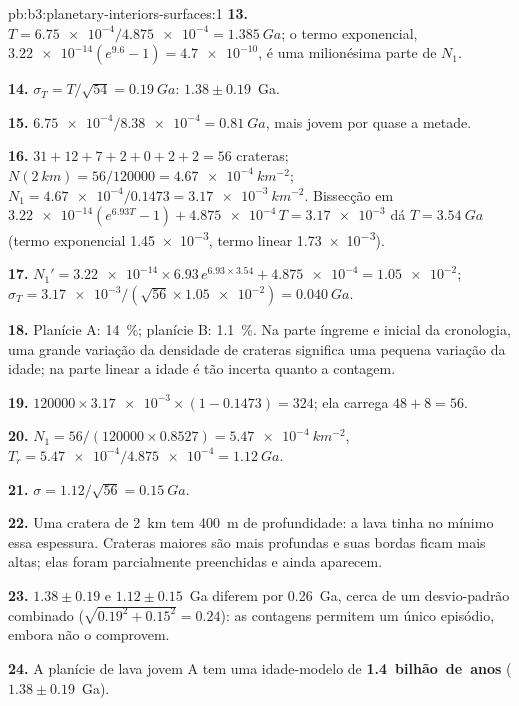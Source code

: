 \begin{solution}{pb:b3:planetary-interiors-surfaces:1}
\textbf{13.} $T = \num{6.75e-4}/\num{4.875e-4} = \qty{1.385}{Ga}$; o
termo exponencial, $\num{3.22e-14}(e^{9.6} - 1) = \num{4.7e-10}$, é uma
milionésima parte de $N_1$.

\textbf{14.} $\sigma_T = T/\sqrt{54} = \qty{0.19}{Ga}$: $1.38 \pm 0.19$~Ga.

\textbf{15.} $\num{6.75e-4}/\num{8.38e-4} = \qty{0.81}{Ga}$, mais jovem por
quase a metade.

\textbf{16.} $31 + 12 + 7 + 2 + 0 + 2 + 2 = 56$ crateras; $N(\qty{2}{km}) =
56/120000 = \qty{4.67e-4}{km^{-2}}$; $N_1 = \num{4.67e-4}/0.1473 =
\qty{3.17e-3}{km^{-2}}$. Bissecção em $\num{3.22e-14}(e^{6.93T} - 1) +
\num{4.875e-4}\,T = \num{3.17e-3}$ dá $T = \qty{3.54}{Ga}$ (termo exponencial
\num{1.45e-3}, termo linear \num{1.73e-3}).

\textbf{17.} $N_1' = \num{3.22e-14}\times6.93\,e^{6.93\times3.54} +
\num{4.875e-4} = \num{1.05e-2}$; $\sigma_T = \num{3.17e-3}/(\sqrt{56}\times
\num{1.05e-2}) = \qty{0.040}{Ga}$.

\textbf{18.} Planície A: \qty{14}{\percent}; planície B: \qty{1.1}{\percent}. Na
parte íngreme e inicial da cronologia, uma grande variação da densidade de
crateras significa uma pequena variação da idade; na parte linear a idade é tão
incerta quanto a contagem.

\textbf{19.} $120000\times\num{3.17e-3}\times(1 - 0.1473) = 324$; ela
carrega $48 + 8 = 56$.

\textbf{20.} $N_1 = 56/(120000\times0.8527) = \qty{5.47e-4}{km^{-2}}$,
$T_r = \num{5.47e-4}/\num{4.875e-4} = \qty{1.12}{Ga}$.

\textbf{21.} $\sigma = 1.12/\sqrt{56} = \qty{0.15}{Ga}$.

\textbf{22.} Uma cratera de \qty{2}{km} tem \qty{400}{m} de profundidade: a lava tinha
no mínimo essa espessura. Crateras maiores são mais profundas e suas bordas
ficam mais altas; elas foram parcialmente preenchidas e ainda aparecem.

\textbf{23.} $1.38 \pm 0.19$ e $1.12 \pm 0.15$~Ga diferem por \qty{0.26}{Ga},
cerca de um desvio-padrão combinado ($\sqrt{0.19^2 + 0.15^2} = 0.24$):
as contagens permitem um único episódio, embora não o comprovem.

\textbf{24.} A planície de lava jovem A tem uma idade-modelo de
\textbf{1.4~bilhão~de~anos} ($1.38 \pm 0.19$~Ga).
\end{solution}
